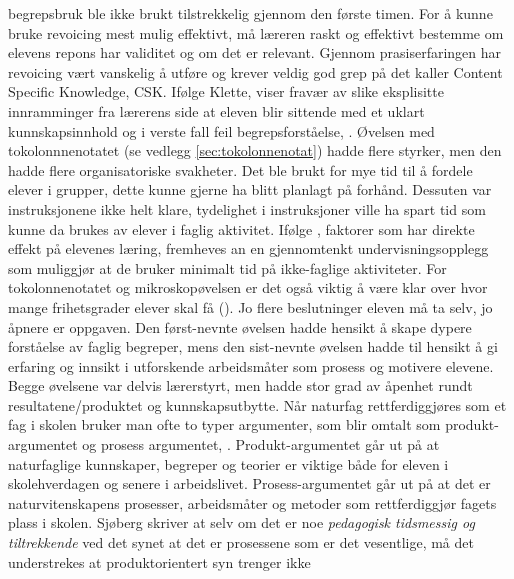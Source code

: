 \documentclass[main.tex]{subfiles}
\begin{document}
begrepsbruk ble ikke brukt tilstrekkelig gjennom den første timen. For å kunne bruke revoicing mest 
mulig effektivt, må læreren raskt og effektivt bestemme om elevens repons har validitet og om det er 
relevant. Gjennom prasiserfaringen har revoicing vært vanskelig å utføre og krever veldig god grep 
på det  kaller Content Specific Knowledge, CSK. Ifølge Klette, viser fravær av slike 
eksplisitte innramminger fra lærerens side at eleven blir sittende med et uklart kunnskapsinnhold og 
i verste fall feil begrepsforståelse, . 
\newline
\newline
Øvelsen med tokolonnnenotatet (se vedlegg \ref{sec:tokolonnenotat}) hadde flere styrker, men den 
hadde flere organisatoriske svakheter. Det ble brukt for mye tid til å fordele elever i grupper, 
dette kunne gjerne ha blitt planlagt på forhånd. Dessuten var instruksjonene ikke helt klare, 
tydelighet i instruksjoner ville ha spart tid som kunne da brukes av elever i faglig aktivitet. 
Ifølge , faktorer som har direkte effekt på elevenes læring, fremheves an en 
gjennomtenkt undervisningsopplegg som muliggjør at de bruker minimalt tid på ikke-faglige 
aktiviteter. For tokolonnenotatet og mikroskopøvelsen er det også viktig å være klar over hvor mange 
frihetsgrader elever skal få (). Jo flere beslutninger eleven må ta selv, jo åpnere 
er oppgaven. Den først-nevnte øvelsen hadde hensikt å skape dypere forståelse av faglig begreper, 
mens den sist-nevnte øvelsen hadde til hensikt å gi erfaring og innsikt i utforskende arbeidsmåter 
som prosess og motivere elevene. Begge øvelsene var delvis lærerstyrt, men hadde stor grad av 
åpenhet rundt resultatene/produktet og kunnskapsutbytte.
\newline
\newline
Når naturfag rettferdiggjøres som et fag i skolen bruker man ofte to typer argumenter, som blir
omtalt som produkt-argumentet og prosess argumentet, . Produkt-argumentet går 
ut på at naturfaglige kunnskaper, begreper og teorier er viktige både for eleven i skolehverdagen og 
senere i arbeidslivet. Prosess-argumentet går ut på at det er naturvitenskapens prosesser, 
arbeidsmåter og metoder som rettferdiggjør fagets plass i skolen. \iffalse \citeauthor{sjob04} \else 
Sjøberg \fi skriver at selv om det er noe \emph{pedagogisk tidsmessig og tiltrekkende} ved det synet 
at det er prosessene som er det vesentlige, må det understrekes at produktorientert syn trenger ikke 
\end{document}
